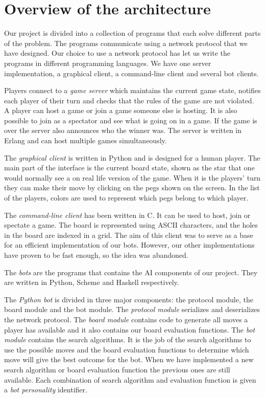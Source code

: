 \section{Overview of the architecture}

Our project is divided into a collection of programs that each solve
different parts of the problem. The programs communicate using a
network protocol that we have designed. Our choice to use a network
protocol has let us write the programs in different programming
languages. We have one server implementation, a graphical client, a
command-line client and several bot clients.

Players connect to a \emph{game server} which maintains the current
game state, notifies each player of their turn and checks that the
rules of the game are not violated. A player can host a game or join a
game someone else is hosting. It is also possible to join as a
spectator and see what is going on in a game. If the game is over the
server also announces who the winner was. The server is written in
Erlang and can host multiple games simultaneously.

The \emph{graphical client} is written in Python and is designed for a
human player. The main part of the interface is the current board
state, shown as the star that one would normally see a on real life
version of the game. When it is the players' turn they can make their
move by clicking on the pegs shown on the screen.
In the list of the players, colors are used to represent which pegs belong to
which player.

The \emph{command-line client} has been written in C. It can be used
to host, join or spectate a game. The board is represented using ASCII
characters, and the holes in the board are indexed in a grid. The aim
of this client was to serve as a base for an efficient implementation
of our bots. However, our other implementations have proven to be fast
enough, so the idea was abandoned.

The \emph{bots} are the programs that contains the AI components of our
project. They are written in Python, Scheme and Haskell respectively.

The \emph{Python bot} is divided in three major components: the protocol
module, the board module and the bot module. The \emph{protocol module}
serializes and deserializes the network protocol. The \emph{board module}
contains code to generate all moves a player has available and it also
contains our board evaluation functions. The \emph{bot module} contains
the search algorithms. It is the job of the search algorithms to use the
possible moves and the board evaluation functions to determine which move
will give the best outcome for the bot. When we have implemented a new
search algorithm or board evaluation function the previous ones are still
available. Each combination of search algorithm and evaluation function
is given a \emph{bot personality} identifier.

